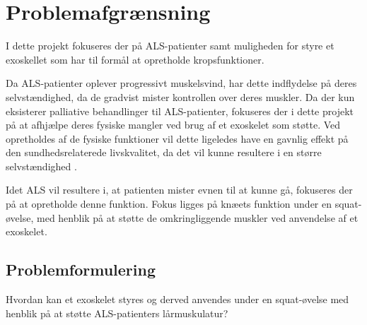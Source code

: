 \section{Problemafgrænsning}
I dette projekt fokuseres der på ALS-patienter samt muligheden for styre et exoskellet som har til formål at opretholde kropsfunktioner. 

Da ALS-patienter oplever progressivt muskelsvind, har dette indflydelse på deres selvstændighed, da de gradvist mister kontrollen over deres muskler. Da der kun eksisterer palliative behandlinger til ALS-patienter, fokuseres der i dette projekt på at afhjælpe deres fysiske mangler ved brug af et exoskelet som støtte.
Ved opretholdes af de fysiske funktioner vil dette ligeledes have en gavnlig effekt på den sundhedsrelaterede livskvalitet, da det vil kunne resultere i en større selvstændighed \citep{ilse2015, tramonti2012}.%

Idet ALS vil resultere i, at patienten mister evnen til at kunne gå, fokuseres der på at opretholde denne funktion. Fokus ligges på knæets funktion under en squat-øvelse, med henblik på at støtte de omkringliggende muskler ved anvendelse af et exoskelet.

\subsection{Problemformulering}
Hvordan kan et exoskelet styres og derved anvendes under en squat-øvelse med henblik på at støtte ALS-patienters lårmuskulatur?